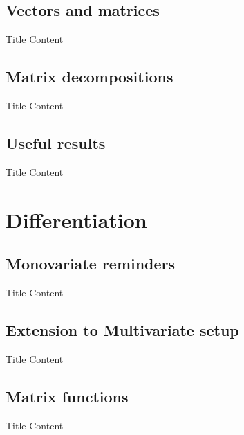 \documentclass[aspectratio=1610]{beamer}
\begin{document}
\subsection{Vectors and matrices}

\begin{frame}{Title}
Content
\end{frame}

\subsection{Matrix decompositions}

\begin{frame}{Title}
Content
\end{frame}

\subsection{Useful results}

\begin{frame}{Title}
Content
\end{frame}

\section{Differentiation}

\subsection{Monovariate reminders}

\begin{frame}{Title}
Content
\end{frame}

\subsection{Extension to Multivariate setup}

\begin{frame}{Title}
Content
\end{frame}

\subsection{Matrix functions}

\begin{frame}{Title}
Content
\end{frame}
\end{document}

